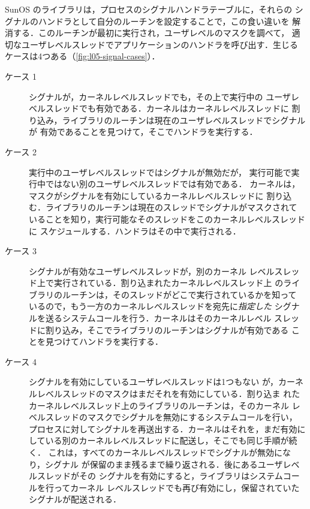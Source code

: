 \documentclass[../main.tex]{subfiles}
\begin{document}
SunOS のライブラリは，プロセスのシグナルハンドラテーブルに，それらの
シグナルのハンドラとして自分のルーチンを設定することで，この食い違いを
解消する．このルーチンが最初に実行され，ユーザレベルのマスクを調べて，
適切なユーザレベルスレッドでアプリケーションのハンドラを呼び出す．生じる
ケースは4つある（\cref{fig:l05-signal-cases}）．
\begin{description}
  \item[ケース 1] シグナルが，カーネルレベルスレッドでも，その上で実行中の
    ユーザレベルスレッドでも有効である．カーネルはカーネルレベルスレッドに
    割り込み，ライブラリのルーチンは現在のユーザレベルスレッドでシグナルが
    有効であることを見つけて，そこでハンドラを実行する．
  \item[ケース 2] 実行中のユーザレベルスレッドではシグナルが無効だが，
    実行可能で実行中ではない別のユーザレベルスレッドでは有効である．
    カーネルは，マスクがシグナルを有効にしているカーネルレベルスレッドに
    割り込む．ライブラリのルーチンは現在のスレッドでシグナルがマスクされて
    いることを知り，実行可能なそのスレッドをこのカーネルレベルスレッドに
    スケジュールする．ハンドラはその中で実行される．
  \item[ケース 3] シグナルが有効なユーザレベルスレッドが，別のカーネル
    レベルスレッド上で実行されている．割り込まれたカーネルレベルスレッド上
    のライブラリのルーチンは，そのスレッドがどこで実行されているかを知って
    いるので，もう一方のカーネルレベルスレッドを宛先に\emph{指定した}
    シグナルを送るシステムコールを行う．カーネルはそのカーネルレベル
    スレッドに割り込み，そこでライブラリのルーチンはシグナルが有効である
    ことを見つけてハンドラを実行する．
  \item[ケース 4] シグナルを有効にしているユーザレベルスレッドは1つもない
    が，カーネルレベルスレッドのマスクはまだそれを有効にしている．割り込ま
    れたカーネルレベルスレッド上のライブラリのルーチンは，そのカーネル
    レベルスレッドのマスクでシグナルを無効にするシステムコールを行い，
    プロセスに対してシグナルを再送出する．カーネルはそれを，まだ有効に
    している別のカーネルレベルスレッドに配送し，そこでも同じ手順が続く．
    これは，すべてのカーネルレベルスレッドでシグナルが無効になり，シグナル
    が保留のまま残るまで繰り返される．後にあるユーザレベルスレッドがその
    シグナルを有効にすると，ライブラリはシステムコールを行ってカーネル
    レベルスレッドでも再び有効にし，保留されていたシグナルが配送される．%
\end{description}
\end{document}
